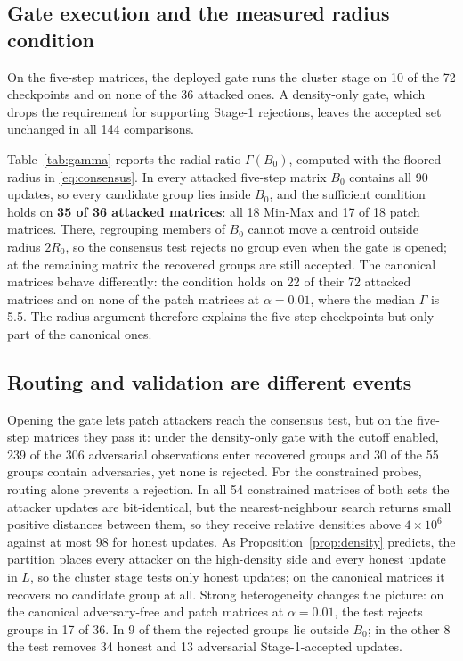 \documentclass[journal]{IEEEtran}
\begin{document}
\subsection{Gate execution and the measured radius condition}
On the five-step matrices, the deployed gate runs the cluster stage on 10 of the 72 checkpoints and on none of the 36 attacked ones. A density-only gate, which drops the requirement for supporting Stage-1 rejections, leaves the accepted set unchanged in all 144 comparisons.


Table~\ref{tab:gamma} reports the radial ratio $\Gamma(B_0)$, computed with the floored radius in \eqref{eq:consensus}. In every attacked five-step matrix $B_0$ contains all 90 updates, so every candidate group lies inside $B_0$, and the sufficient condition holds on \textbf{35 of 36 attacked matrices}: all 18 Min-Max and 17 of 18 patch matrices. There, regrouping members of $B_0$ cannot move a centroid outside radius $2R_0$, so the consensus test rejects no group even when the gate is opened; at the remaining matrix the recovered groups are still accepted. The canonical matrices behave differently: the condition holds on 22 of their 72 attacked matrices and on none of the patch matrices at $\alpha=0.01$, where the median $\Gamma$ is 5.5. The radius argument therefore explains the five-step checkpoints but only part of the canonical ones.

\subsection{Routing and validation are different events}
Opening the gate lets patch attackers reach the consensus test, but on the five-step matrices they pass it: under the density-only gate with the cutoff enabled, 239 of the 306 adversarial observations enter recovered groups and 30 of the 55 groups contain adversaries, yet none is rejected. For the constrained probes, routing alone prevents a rejection. In all 54 constrained matrices of both sets the attacker updates are bit-identical, but the nearest-neighbour search returns small positive distances between them, so they receive relative densities above $4\times10^{6}$ against at most 98 for honest updates. As Proposition~\ref{prop:density} predicts, the partition places every attacker on the high-density side and every honest update in $L$, so the cluster stage tests only honest updates; on the canonical matrices it recovers no candidate group at all. Strong heterogeneity changes the picture: on the canonical adversary-free and patch matrices at $\alpha=0.01$, the test rejects groups in 17 of 36. In 9 of them the rejected groups lie outside $B_0$; in the other 8 the test removes 34 honest and 13 adversarial Stage-1-accepted updates.
\end{document}
